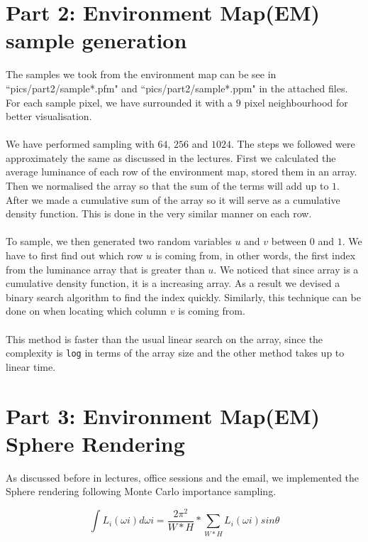 \documentclass{article}
\begin{document}
\section{Part 2: Environment Map(EM) sample generation}
The samples we took from the environment map can be see in 
``pics/part2/sample*.pfm" and ``pics/part2/sample*.ppm" in the 
attached files. For each sample pixel, we have surrounded it with a $9$ pixel 
neighbourhood for better visualisation. \\
\\
We have performed sampling with $64$, $256$
and $1024$. The steps we followed were approximately the same as discussed in the
lectures. First we calculated the average luminance of each row of the environment
map, stored them in an array. Then we normalised the array so that the sum of the 
terms will add up to $1$. After we made a cumulative sum of the array so it will 
serve as a cumulative density function. This is done in the very similar manner
on each row.\\
\\
To sample, we then generated two random variables $u$ and $v$ between $0$ and $1$.
We have to first find out which row $u$ is coming from, in other words, the first
index from the luminance array that is greater than $u$. We noticed that since
array is a cumulative density function, it is a increasing array. As a result we  
devised a binary search algorithm to find the index quickly. Similarly, this 
technique can be done on when locating which column $v$ is coming from.\\
\\
This method is faster than the usual linear search on the array, since the complexity
is \texttt{log} in terms of the array size and the other method takes up to 
linear time.

\section{Part 3: Environment Map(EM) Sphere Rendering}
As discussed before in lectures, office sessions and the email, we implemented the Sphere
rendering following Monte Carlo importance sampling.

$$\int L_{i}(\omega i) d\omega i = \frac{2\pi^{2}}{W*H} *\sum_{W*H}L_{i}(\omega i) sin\theta$$
\end{document}
